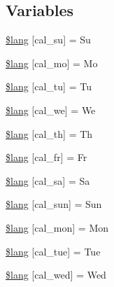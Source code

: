 \subsection*{Variables}
\begin{DoxyCompactItemize}
\item 
\hyperlink{calendar__lang_8php_a120ec4cf98cb46665da894790bf9d68b}{\$lang} \mbox{[}\textquotesingle{}cal\+\_\+su\textquotesingle{}\mbox{]} = \textquotesingle{}Su\textquotesingle{}
\item 
\hyperlink{calendar__lang_8php_addb07b314f8ffca137dd372ffccc0086}{\$lang} \mbox{[}\textquotesingle{}cal\+\_\+mo\textquotesingle{}\mbox{]} = \textquotesingle{}Mo\textquotesingle{}
\item 
\hyperlink{calendar__lang_8php_ae6d1a5da4eaa6f0ea7b90c1f1f8c5d58}{\$lang} \mbox{[}\textquotesingle{}cal\+\_\+tu\textquotesingle{}\mbox{]} = \textquotesingle{}Tu\textquotesingle{}
\item 
\hyperlink{calendar__lang_8php_acfa4ce5b6c72a960be91a2ebd7049e51}{\$lang} \mbox{[}\textquotesingle{}cal\+\_\+we\textquotesingle{}\mbox{]} = \textquotesingle{}We\textquotesingle{}
\item 
\hyperlink{calendar__lang_8php_af5b11785dc4aa3ef3df6a3fe1d3158c4}{\$lang} \mbox{[}\textquotesingle{}cal\+\_\+th\textquotesingle{}\mbox{]} = \textquotesingle{}Th\textquotesingle{}
\item 
\hyperlink{calendar__lang_8php_a7edbb0ca2d2bf43cf32e8b946d87831d}{\$lang} \mbox{[}\textquotesingle{}cal\+\_\+fr\textquotesingle{}\mbox{]} = \textquotesingle{}Fr\textquotesingle{}
\item 
\hyperlink{calendar__lang_8php_a16c4faf67e8c4d3aff3fbd1cd831a0d1}{\$lang} \mbox{[}\textquotesingle{}cal\+\_\+sa\textquotesingle{}\mbox{]} = \textquotesingle{}Sa\textquotesingle{}
\item 
\hyperlink{calendar__lang_8php_a6a2329330c22e5e6058f53061fae0b62}{\$lang} \mbox{[}\textquotesingle{}cal\+\_\+sun\textquotesingle{}\mbox{]} = \textquotesingle{}Sun\textquotesingle{}
\item 
\hyperlink{calendar__lang_8php_a3e1c2966ff8ebb4b528d9a6e60a7a11c}{\$lang} \mbox{[}\textquotesingle{}cal\+\_\+mon\textquotesingle{}\mbox{]} = \textquotesingle{}Mon\textquotesingle{}
\item 
\hyperlink{calendar__lang_8php_ad6b1b4ce855d9ed3f88dc4e7e71f5248}{\$lang} \mbox{[}\textquotesingle{}cal\+\_\+tue\textquotesingle{}\mbox{]} = \textquotesingle{}Tue\textquotesingle{}
\item 
\hyperlink{calendar__lang_8php_a94d7b85acb850c5930399c9099b22412}{\$lang} \mbox{[}\textquotesingle{}cal\+\_\+wed\textquotesingle{}\mbox{]} = \textquotesingle{}Wed\textquotesingle{}

\end{DoxyCompactItemize}
